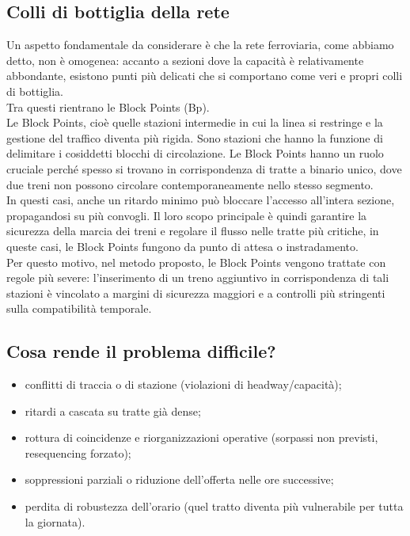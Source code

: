 \documentclass[a4paper,12pt]{report}
\begin{document}
\subsection{Colli di bottiglia della rete}
Un aspetto fondamentale da considerare è che la rete ferroviaria, come abbiamo detto, non è omogenea: accanto a sezioni dove la capacità è relativamente abbondante, esistono punti più delicati che si comportano come veri e propri colli di bottiglia.\\ Tra questi rientrano le Block Points (Bp).\\  Le Block Points, cioè quelle stazioni intermedie in cui la linea si restringe e la gestione del traffico diventa più rigida. 
Sono stazioni che hanno la funzione di delimitare i cosiddetti blocchi di circolazione.
Le Block Points hanno un ruolo cruciale perché spesso si trovano in corrispondenza di tratte a binario unico, dove due treni non possono circolare contemporaneamente nello stesso segmento. \\ In questi casi, anche un ritardo minimo può bloccare l’accesso all’intera sezione, propagandosi su più convogli.
Il loro scopo principale è quindi garantire la sicurezza della marcia dei treni e regolare il flusso nelle tratte più critiche, in queste casi, le Block Points fungono da punto di attesa o instradamento.\\
Per questo motivo, nel metodo proposto, le Block Points vengono trattate con regole più severe: l’inserimento di un treno aggiuntivo in corrispondenza di tali stazioni è vincolato a margini di sicurezza maggiori e a controlli più stringenti sulla compatibilità temporale.


\subsection{Cosa rende il problema difficile?}
\begin{itemize}
\item conflitti di traccia o di stazione (violazioni di headway/capacità);

\item ritardi a cascata su tratte già dense;

\item rottura di coincidenze e riorganizzazioni operative (sorpassi non previsti, resequencing forzato);

\item soppressioni parziali o riduzione dell’offerta nelle ore successive;

\item perdita di robustezza dell’orario (quel tratto diventa più vulnerabile per tutta la giornata).
\end{itemize}
\end{document}
